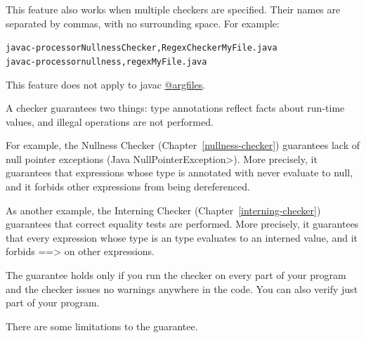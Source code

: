 This feature also works when multiple checkers are specified.
Their names are separated by commas, with no surrounding space.
For example:

\begin{alltt}
  javac -processor NullnessChecker,RegexChecker MyFile.java
  javac -processor nullness,regex MyFile.java
\end{alltt}

This feature does not apply to javac \href{https://docs.oracle.com/javase/7/docs/technotes/tools/windows/javac.html#commandlineargfile}{@argfiles}.



A checker guarantees two things:  type annotations reflect facts about
run-time values, and illegal operations are not performed.

For example, the Nullness Checker (Chapter~\ref{nullness-checker})
guarantees lack of null pointer exceptions (Java \<NullPointerException>).
More precisely, it guarantees
that expressions whose type is annotated with
 never evaluate to null,
and it forbids other expressions from being dereferenced.

As another example, the Interning Checker (Chapter~\ref{interning-checker})
guarantees that correct equality tests are performed.
More precisely, it guarantees that
every expression whose type is an  type
evaluates to an interned value, and it forbids
\<==> on other expressions.

The guarantee holds only if you run the checker on every part of your
program and the checker issues no warnings anywhere in the code.
You can also verify just part of your program.

There are some limitations to the guarantee.


